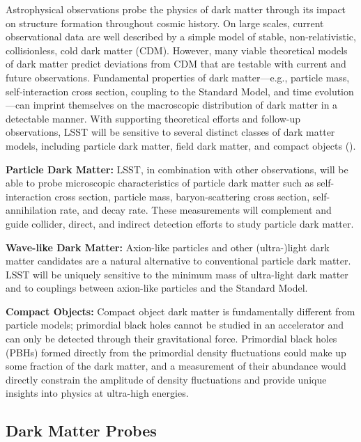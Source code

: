 \documentclass[12pt]{article}
\begin{document}
Astrophysical observations probe the physics of dark matter through its
impact on structure formation throughout cosmic history.
On large scales, current observational data are well described by a simple model of stable, non-relativistic, collisionless, cold dark matter (CDM).
However, many viable theoretical models of dark matter predict deviations from CDM that are testable with current and future observations.
Fundamental properties of dark matter---e.g., particle mass, self-interaction cross section, coupling to the Standard Model, and time evolution---can imprint themselves on the macroscopic distribution of dark matter in a detectable manner. With supporting theoretical efforts and follow-up observations, LSST will be sensitive to several distinct classes of dark matter models, including particle dark matter, field dark matter, and compact objects ().

\noindent \textbf{Particle Dark Matter:} LSST, in combination with other observations, will be able to probe microscopic characteristics of particle dark matter such as self-interaction cross section, particle mass, baryon-scattering cross section, self-annihilation rate, and decay rate. These measurements will complement and guide collider, direct, and indirect detection efforts to study particle dark matter.


\noindent \textbf{Wave-like Dark Matter:} Axion-like particles and other (ultra-)light dark matter candidates are a natural alternative to conventional particle dark matter. LSST will be uniquely sensitive to the minimum mass of ultra-light dark matter and to couplings between axion-like particles and the Standard Model.

\noindent \textbf{Compact Objects:} Compact object dark matter is fundamentally different from particle models; primordial black holes cannot be studied in an accelerator and can only be detected through their gravitational force. 
Primordial black holes (PBHs) formed directly from the primordial density fluctuations could make up some fraction of the dark matter, and a measurement of their abundance would directly constrain the amplitude of density fluctuations and provide unique insights into physics at ultra-high energies.


\vspace{-1em} \subsection*{Dark Matter Probes} \vspace{-0.5em}
\end{document}
